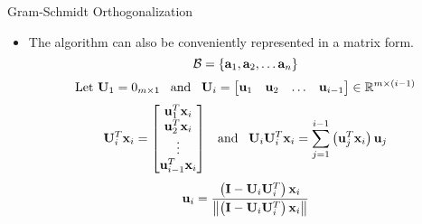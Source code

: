 \documentclass[aspectratio=169]{beamer}
\def\mf{\ensuremath\mathbf}
\def\mb{\ensuremath\mathbb}
\def\mc{\ensuremath\mathcal}
\def\lp{\ensuremath\left(}
\def\rp{\ensuremath\right)}
\begin{document}
\begin{frame}[t]{Gram-Schmidt Orthogonalization}
\vspace{-0.25cm}
\begin{itemize}
    \item The algorithm can also be conveniently represented in a matrix form.
    \[ \mc{B} = \left\{\mf{a}_1, \mf{a}_2, \ldots \mf{a}_n\right\} \]
    \[ \text{Let } \mf{U}_1 = 0_{m \times 1}\,\,\,\text{ and }\,\,\,\mf{U}_i = \begin{bmatrix*}[r]\mf{u}_1 & \mf{u}_2 & \ldots & \mf{u}_{i-1}\end{bmatrix*} \in \mb{R}^{m \times (i - 1)}
    \]
    \[ \mf{U}_i^T\mf{x}_i = \begin{bmatrix*}[c]\mf{u}_1^T\mf{x}_i\\\mf{u}_2^T\mf{x}_i\\\vdots\\\mf{u}_{i-1}^T\mf{x}_i\\\end{bmatrix*}\,\,\,\text{ and }\,\,\, \mf{U}_i\mf{U}_i^T\mf{x}_i = \sum_{j=1}^{i-1}\lp \mf{u}_j^T\mf{x}_i\rp \mf{u}_j
    \]
    \[ \mf{u}_i = \frac{\lp \mf{I} - \mf{U}_i\mf{U}_i^T\rp \mf{x}_i}{\left\lVert \lp \mf{I} - \mf{U}_i\mf{U}_i^T\rp \mf{x}_i\right\rVert} \]
\end{itemize}
\end{frame}
\end{document}
